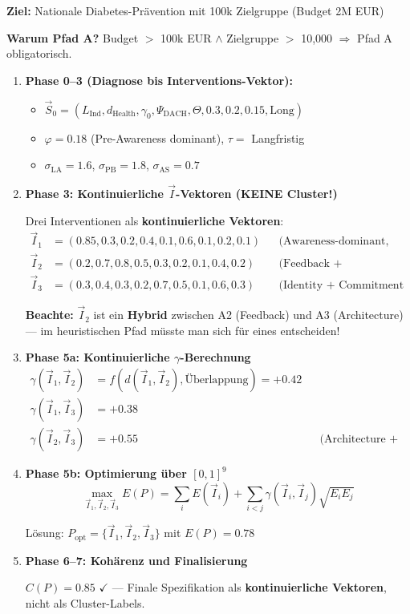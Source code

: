 \textbf{Ziel:} Nationale Diabetes-Prävention mit 100k Zielgruppe (Budget 2M EUR)

\textbf{Warum Pfad A?} Budget $>$ 100k EUR $\land$ Zielgruppe $>$ 10,000 $\Rightarrow$ Pfad A obligatorisch.

\begin{enumerate}
\item \textbf{Phase 0--3 (Diagnose bis Interventions-Vektor):}
\begin{itemize}[nosep]
\item $\vec{S}_0 = (L_{\text{Ind}}, d_{\text{Health}}, \gamma_0, \Psi_{\text{DACH}}, \Theta, 0.3, 0.2, 0.15, \text{Long})$
\item $\varphi = 0.18$ (Pre-Awareness dominant), $\tau = $ Langfristig
\item $\sigma_{\text{LA}} = 1.6$, $\sigma_{\text{PB}} = 1.8$, $\sigma_{\text{AS}} = 0.7$
\end{itemize}

\item \textbf{Phase 3: Kontinuierliche $\vec{I}$-Vektoren (KEINE Cluster!)}

Drei Interventionen als \textbf{kontinuierliche Vektoren}:
\begin{align*}
\vec{I}_1 &= (0.85, 0.3, 0.2, 0.4, 0.1, 0.6, 0.1, 0.2, 0.1) && \text{(Awareness-dominant, Social-Komponente)} \\
\vec{I}_2 &= (0.2, 0.7, 0.8, 0.5, 0.3, 0.2, 0.1, 0.4, 0.2) && \text{(Feedback + Architecture hybrid)} \\
\vec{I}_3 &= (0.3, 0.4, 0.3, 0.2, 0.7, 0.5, 0.1, 0.6, 0.3) && \text{(Identity + Commitment hybrid)}
\end{align*}

\textbf{Beachte:} $\vec{I}_2$ ist ein \textbf{Hybrid} zwischen A2 (Feedback) und A3 (Architecture) --- im heuristischen Pfad müsste man sich für eines entscheiden!

\item \textbf{Phase 5a: Kontinuierliche $\gamma$-Berechnung}
\begin{align*}
\gamma(\vec{I}_1, \vec{I}_2) &= f(d(\vec{I}_1, \vec{I}_2), \text{Überlappung}) = +0.42 \\
\gamma(\vec{I}_1, \vec{I}_3) &= +0.38 \\
\gamma(\vec{I}_2, \vec{I}_3) &= +0.55 && \text{(Architecture + Commitment: hohe Synergie)}
\end{align*}

\item \textbf{Phase 5b: Optimierung über $[0,1]^9$}
\begin{equation*}
\max_{\vec{I}_1, \vec{I}_2, \vec{I}_3} E(P) = \sum_i E(\vec{I}_i) + \sum_{i<j} \gamma(\vec{I}_i, \vec{I}_j) \sqrt{E_i E_j}
\end{equation*}

Lösung: $P_{\text{opt}} = \{\vec{I}_1, \vec{I}_2, \vec{I}_3\}$ mit $E(P) = 0.78$

\item \textbf{Phase 6--7: Kohärenz und Finalisierung}

$C(P) = 0.85$ $\checkmark$ --- Finale Spezifikation als \textbf{kontinuierliche Vektoren}, nicht als Cluster-Labels.
\end{enumerate}


